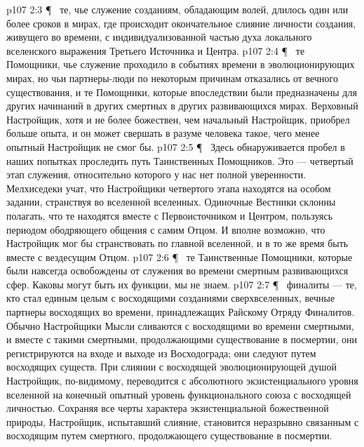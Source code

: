 \vs p107 2:3 \P\ \bibnobreakspace {} те, чье служение созданиям, обладающим волей, длилось один или более сроков в мирах, где происходит окончательное слияние личности создания, живущего во времени, с индивидуализованной частью духа локального вселенского выражения Третьего Источника и Центра.
\vs p107 2:4 \P\ \bibnobreakspace {} те Помощники, чье служение проходило в событиях времени в эволюционирующих мирах, но чьи партнеры\hyp{}люди по некоторым причинам отказались от вечного существования, и те Помощники, которые впоследствии были предназначены для других начинаний в других смертных в других развивающихся мирах. Верховный Настройщик, хотя и не более божествен, чем начальный Настройщик, приобрел больше опыта, и он может свершать в разуме человека такое, чего менее опытный Настройщик не смог бы.
\vs p107 2:5 \P\ \bibnobreakspace {} Здесь обнаруживается пробел в наших попытках проследить путь Таинственных Помощников. Это --- четвертый этап служения, относительно которого у нас нет полной уверенности. Мелхиседеки учат, что Настройщики четвертого этапа находятся на особом задании, странствуя во вселенной вселенных. Одиночные Вестники склонны полагать, что те находятся вместе с Первоисточником и Центром, пользуясь периодом ободряющего общения с самим Отцом. И вполне возможно, что Настройщик мог бы странствовать по главной вселенной, и в то же время быть вместе с вездесущим Отцом.
\vs p107 2:6 \P\ \bibnobreakspace {} те Таинственные Помощники, которые были навсегда освобождены от служения во времени смертным развивающихся сфер. Каковы могут быть их функции, мы не знаем.
\vs p107 2:7 \P\ \bibnobreakspace {} финалиты --- те, кто стал единым целым с восходящими созданиями сверхвселенных, вечные партнеры восходящих во времени, принадлежащих Райскому Отряду Финалитов. Обычно Настройщики Мысли сливаются с восходящими во времени смертными, и вместе с такими смертными, продолжающими существование в посмертии, они регистрируются на входе и выходе из Восходограда; они следуют путем восходящих существ. При слиянии с восходящей эволюционирующей душой Настройщик, по\hyp{}видимому, переводится с абсолютного экзистенциального уровня вселенной на конечный опытный уровень функционального союза с восходящей личностью. Сохраняя все черты характера экзистенциальной божественной природы, Настройщик, испытавший слияние, становится неразрывно связанным с восходящим путем смертного, продолжающего существование в посмертии.
